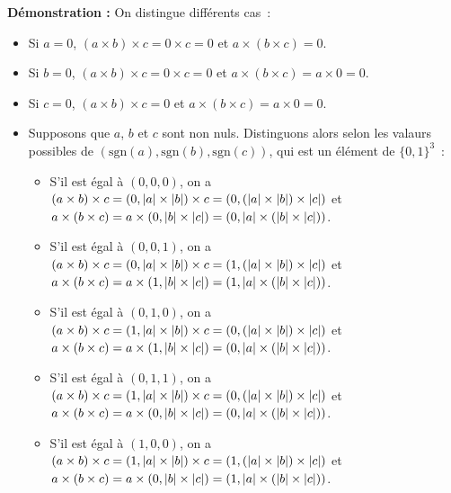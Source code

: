 \noindent\textbf{Démonstration :} On distingue différents cas : 
    \begin{itemize}[nosep]
        \item Si $a = 0$, $(a \times b) \times c = 0 \times c = 0$ et $a \times (b \times c) = 0$.
        \item Si $b = 0$, $(a \times b) \times c = 0 \times c = 0$ et $a \times (b \times c) = a \times 0 = 0$.
        \item Si $c = 0$, $(a \times b) \times c = 0$ et $a \times (b \times c) = a \times 0 = 0$.
        \item Supposons que $a$, $b$ et $c$ sont non nuls. 
            Distinguons alors selon les valaurs possibles de $(\mathrm{sgn}(a), \mathrm{sgn}(b), \mathrm{sgn}(c))$, qui est un élément de $\lbrace 0, 1 \rbrace^3$ :
            \begin{itemize}[nosep]
                \item S'il est égal à $(0,0,0)$, on a 
                    $(a \times b) \times c = (0,\left\lvert a \right\rvert \times \left\lvert b \right\rvert) \times c = (0, (\left\lvert a \right\rvert \times \left\lvert b \right\rvert) \times \left\lvert c \right\rvert)$ et 
                    $a \times (b \times c) = a \times (0, \left\lvert b \right\rvert \times \left\lvert c \right\rvert) = (0, \left\lvert a \right\rvert \times (\left\lvert b \right\rvert \times \left\lvert c \right\rvert))$.
                \item S'il est égal à $(0,0,1)$, on a 
                    $(a \times b) \times c = (0,\left\lvert a \right\rvert \times \left\lvert b \right\rvert) \times c = (1, (\left\lvert a \right\rvert \times \left\lvert b \right\rvert) \times \left\lvert c \right\rvert)$ et 
                    $a \times (b \times c) = a \times (1, \left\lvert b \right\rvert \times \left\lvert c \right\rvert) = (1, \left\lvert a \right\rvert \times (\left\lvert b \right\rvert \times \left\lvert c \right\rvert))$.
                \item S'il est égal à $(0,1,0)$, on a 
                    $(a \times b) \times c = (1,\left\lvert a \right\rvert \times \left\lvert b \right\rvert) \times c = (0, (\left\lvert a \right\rvert \times \left\lvert b \right\rvert) \times \left\lvert c \right\rvert)$ et 
                    $a \times (b \times c) = a \times (1, \left\lvert b \right\rvert \times \left\lvert c \right\rvert) = (0, \left\lvert a \right\rvert \times (\left\lvert b \right\rvert \times \left\lvert c \right\rvert))$.
                \item S'il est égal à $(0,1,1)$, on a 
                    $(a \times b) \times c = (1,\left\lvert a \right\rvert \times \left\lvert b \right\rvert) \times c = (0, (\left\lvert a \right\rvert \times \left\lvert b \right\rvert) \times \left\lvert c \right\rvert)$ et 
                    $a \times (b \times c) = a \times (0, \left\lvert b \right\rvert \times \left\lvert c \right\rvert) = (0, \left\lvert a \right\rvert \times (\left\lvert b \right\rvert \times \left\lvert c \right\rvert))$.
                \item S'il est égal à $(1,0,0)$, on a 
                    $(a \times b) \times c = (1,\left\lvert a \right\rvert \times \left\lvert b \right\rvert) \times c = (1, (\left\lvert a \right\rvert \times \left\lvert b \right\rvert) \times \left\lvert c \right\rvert)$ et 
                    $a \times (b \times c) = a \times (0, \left\lvert b \right\rvert \times \left\lvert c \right\rvert) = (1, \left\lvert a \right\rvert \times (\left\lvert b \right\rvert \times \left\lvert c \right\rvert))$.

\end{itemize}
\end{itemize}
